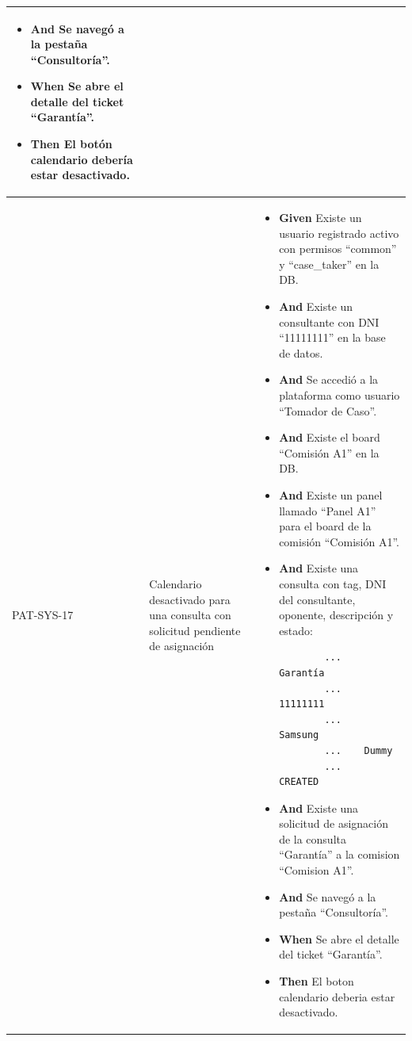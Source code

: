\begin{longtable}{|p{1cm}|p{2.5cm}|p{12cm}|}
\begin{itemize}
        \begin{verbatim}
        ...    Garantía
        ...    11111111
        ...    Samsung
        ...    Dummy
        ...    CREATED
        \end{verbatim}
        \item \textbf{And} Se navegó a la pestaña ``Consultoría''.
        \newline
        \item \textbf{When} Se abre el detalle del ticket ``Garantía''.
        \newline
        \item \textbf{Then} El botón calendario debería estar desactivado.
    \end{itemize}
    \\
    \hline
    PAT-SYS-17 & Calendario desactivado para una consulta con solicitud pendiente de asignación & 
    \begin{itemize}
        \item \textbf{Given} Existe un usuario registrado activo con permisos ``common'' y ``case\_taker'' en la DB.
        \item \textbf{And} Existe un consultante con DNI ``11111111'' en la base de datos.
        \item \textbf{And} Se accedió a la plataforma como usuario ``Tomador de Caso''.
        \item \textbf{And} Existe el board ``Comisión A1'' en la DB.
        \item \textbf{And} Existe un panel llamado ``Panel A1'' para el board de la comisión ``Comisión A1''.
        \item \textbf{And} Existe una consulta con tag, DNI del consultante, oponente, descripción y estado:
        \begin{verbatim}
        ...    Garantía
        ...    11111111
        ...    Samsung
        ...    Dummy
        ...    CREATED
        \end{verbatim}
        \item \textbf{And} Existe una solicitud de asignación de la consulta ``Garantía'' a la comision ``Comision A1''.
        \item \textbf{And} Se navegó a la pestaña ``Consultoría''.
        \newline
        \item \textbf{When} Se abre el detalle del ticket ``Garantía''.
        \newline
        \item \textbf{Then} El boton calendario deberia estar desactivado.

\end{itemize}
\end{longtable}
